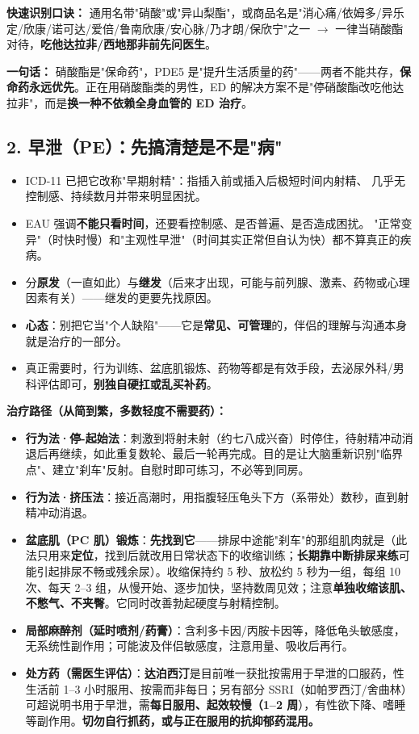 \documentclass[12pt,UTF8,openany]{ctexbook}
\begin{document}
\textbf{快速识别口诀：} 通用名带"硝酸"或"异山梨酯"，或商品名是"消心痛/依姆多/异乐定/欣康/诺可达/爱倍/鲁南欣康/安心脉/乃才朗/保欣宁"之一 $\to$ 一律当硝酸酯对待，\textbf{吃他达拉非/西地那非前先问医生}。

\textbf{一句话：} 硝酸酯是"保命药"，PDE5 是"提升生活质量的药"——两者不能共存，\textbf{保命药永远优先}。正在用硝酸酯类的男性，ED 的解决方案不是"停硝酸酯改吃他达拉非"，而是\textbf{换一种不依赖全身血管的 ED 治疗}。

\subsection*{2. 早泄（PE）：先搞清楚是不是"病"}

\begin{itemize}[leftmargin=2em]
  \item ICD-11 已把它改称"早期射精"：指插入前或插入后极短时间内射精、
        几乎无控制感、持续数月并带来明显困扰。
  \item EAU 强调\textbf{不能只看时间}，还要看控制感、是否普遍、是否造成困扰。
        "正常变异"（时快时慢）和"主观性早泄"（时间其实正常但自认为快）都不算真正的疾病。
  \item 分\textbf{原发}（一直如此）与\textbf{继发}（后来才出现，可能与前列腺、激素、药物或心理因素有关）——继发的更要先找原因。
  \item \textbf{心态}：别把它当"个人缺陷"——它是\textbf{常见、可管理}的，伴侣的理解与沟通本身就是治疗的一部分。
  \item 真正需要时，行为训练、盆底肌锻炼、药物等都是有效手段，去泌尿外科/男科评估即可，\textbf{别独自硬扛或乱买补药}。
\end{itemize}

\textbf{治疗路径（从简到繁，多数轻度不需要药）：}

\begin{itemize}[leftmargin=2em,itemsep=0.3em]
  \item \textbf{行为法·停-起始法}：刺激到将射未射（约七八成兴奋）时停住，待射精冲动消退后再继续，如此重复数轮、最后一轮再完成。目的是让大脑重新识别"临界点"、建立"刹车"反射。自慰时即可练习，不必等到同房。
  \item \textbf{行为法·挤压法}：接近高潮时，用指腹轻压龟头下方（系带处）数秒，直到射精冲动消退。
  \item \textbf{盆底肌（PC 肌）锻炼}：\textbf{先找到它}——排尿中途能"刹车"的那组肌肉就是（此法只用来\textbf{定位}，找到后就改用日常状态下的收缩训练；\textbf{长期靠中断排尿来练}可能引起排尿不畅或残余尿）。收缩保持约 5 秒、放松约 5 秒为一组，每组 10 次、每天 2--3 组，从慢开始、逐步加快，坚持数周见效；注意\textbf{单独收缩该肌、不憋气、不夹臀}。它同时改善勃起硬度与射精控制。
  \item \textbf{局部麻醉剂（延时喷剂/药膏）}：含利多卡因/丙胺卡因等，降低龟头敏感度，无系统性副作用；可能波及伴侣敏感度，注意用量、吸收后再行。
  \item \textbf{处方药（需医生评估）}：\textbf{达泊西汀}是目前唯一获批按需用于早泄的口服药，性生活前 1--3 小时服用、按需而非每日；另有部分 SSRI（如帕罗西汀/舍曲林）可超说明书用于早泄，需\textbf{每日服用、起效较慢（1--2 周}），有性欲下降、嗜睡等副作用。\textbf{切勿自行抓药，或与正在服用的抗抑郁药混用。}
\end{itemize}
\end{document}
